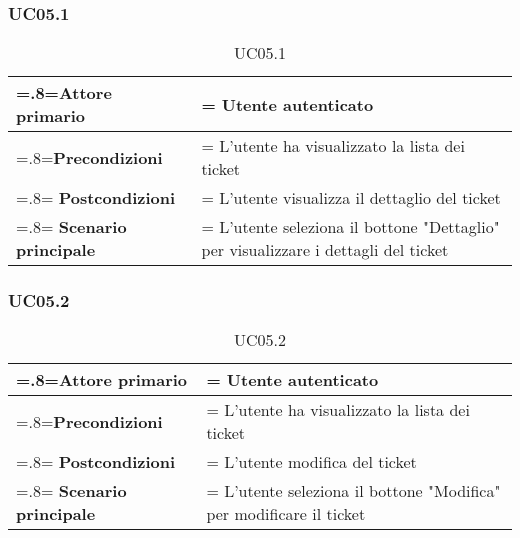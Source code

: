 \subsubsection{UC05.1}
  \begin{table}[H]
                \centering
                \renewcommand{\arraystretch}{1.8}
                \renewcommand\tabularxcolumn[1]{m{#1}}
                \begin{tabularx}{0.9\textwidth} {
                    >{\hsize=.8\hsize\linewidth=\hsize}X
                    >{\hsize=1.2\hsize\linewidth=\hsize}X}
                    \hline
                    \textbf{Attore primario} & Utente autenticato \\
                    \hline
                    \textbf{Precondizioni} & L'utente ha visualizzato la lista dei ticket \\
                    \hline
                    \textbf{Postcondizioni} & L'utente visualizza il dettaglio del ticket \\
                    \hline
                    \textbf{Scenario principale} & L'utente seleziona il bottone "Dettaglio" per visualizzare i dettagli del ticket \\
                    \hline
                  
                \end{tabularx}
                \caption{UC05.1}
            \end{table}   
   
\subsubsection{UC05.2}
  \begin{table}[H]
                \centering
                \renewcommand{\arraystretch}{1.8}
                \renewcommand\tabularxcolumn[1]{m{#1}}
                \begin{tabularx}{0.9\textwidth} {
                    >{\hsize=.8\hsize\linewidth=\hsize}X
                    >{\hsize=1.2\hsize\linewidth=\hsize}X}
                    \hline
                    \textbf{Attore primario} & Utente autenticato \\
                    \hline
                    \textbf{Precondizioni} & L'utente ha visualizzato la lista dei ticket \\
                    \hline
                    \textbf{Postcondizioni} & L'utente modifica del ticket \\
                    \hline
                    \textbf{Scenario principale} & L'utente seleziona il bottone "Modifica" per modificare il ticket \\
                    \hline
                  
                \end{tabularx}
                \caption{UC05.2}
            \end{table}   
                        
